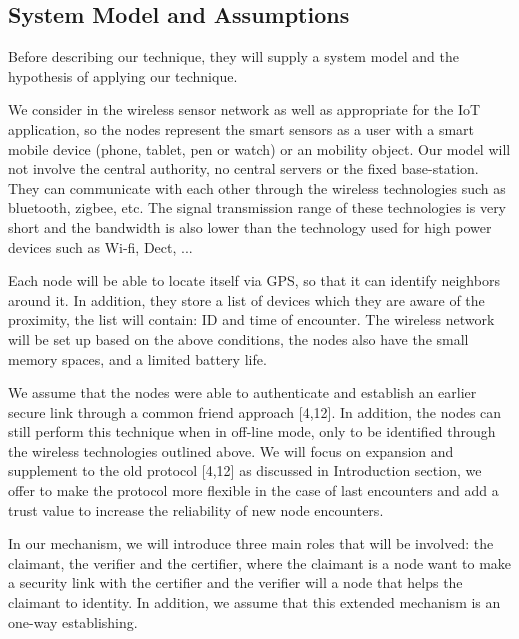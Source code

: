 \documentclass[sigconf]{acmart}
\begin{document}
\subsection{System Model and Assumptions}
{
Before describing our technique, they will supply a system model and the hypothesis of applying our technique.\par
We consider in the wireless sensor network as well as appropriate for the IoT application, so the nodes represent the smart sensors as a user with a smart mobile device (phone, tablet, pen or watch) or an mobility object. Our model will not involve the central authority, no central servers or the fixed base-station. They can communicate with each other through the wireless technologies such as bluetooth, zigbee, etc. The signal transmission range of these technologies is very short and the bandwidth is also lower than the technology used for high power devices such as Wi-fi, Dect, ...\par

Each node will be able to locate itself via GPS, so that it can identify neighbors around it. In addition, they store a list of devices which they are aware of the proximity, the list will contain: ID and time of encounter. The wireless network will be set up based on the above conditions, the nodes also have the small memory spaces, and a limited battery life.\par

We assume that the nodes were able to authenticate and establish an earlier secure link through a common friend approach [4,12]. In addition, the nodes can still perform this technique when in off-line mode, only to be identified through the wireless technologies outlined above. We will focus on expansion and supplement to the old protocol [4,12] as discussed in Introduction section, we offer to make the protocol more flexible in the case of last encounters and add a trust value to increase the reliability of new node encounters.\par

In our mechanism, we will introduce three main roles that will be involved: the claimant, the verifier and the certifier, where the claimant is a node want to make a security link with the certifier and the verifier will a node that helps the claimant to identity. In addition, we assume that this extended mechanism is an one-way establishing.\par
}
\end{document}
